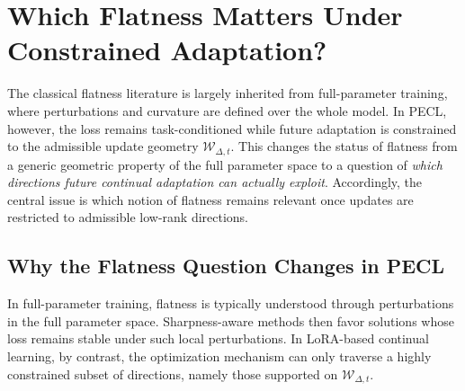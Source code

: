 \documentclass[10pt]{article} %
\begin{document}



\section{Which Flatness Matters Under Constrained Adaptation?}
\label{sec:which-flatness}

The classical flatness literature is largely inherited from full-parameter training, where perturbations and curvature are defined over the whole model.
In PECL, however, the loss remains task-conditioned while future adaptation is constrained to the admissible update geometry $\mathcal{W}_{\Delta,t}$.
This changes the status of flatness from a generic geometric property of the full parameter space to a question of \emph{which directions future continual adaptation can actually exploit}.
Accordingly, the central issue is which notion of flatness remains relevant once updates are restricted to admissible low-rank directions.

\subsection{Why the Flatness Question Changes in PECL}
\label{sec:flatness-question}

In full-parameter training, flatness is typically understood through perturbations in the full parameter space.
Sharpness-aware methods then favor solutions whose loss remains stable under such local perturbations.
In LoRA-based continual learning, by contrast, the optimization mechanism can only traverse a highly constrained subset of directions, namely those supported on $\mathcal{W}_{\Delta,t}$.
\end{document}
